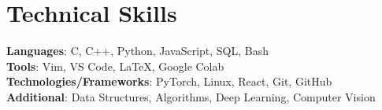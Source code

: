 \documentclass[letterpaper,11pt]{article}
\makeatletter
\newcommand{\resumeItem}[1]{
  \item\small{
    {#1 \vspace{-2pt}}
  }
}
\newcommand{\resumeSubheading}[4]{
  \vspace{-2pt}\item
    \begin{tabular*}{1.0\textwidth}[t]{l@{\extracolsep{\fill}}r}
      \textbf{#1} & \textbf{\small #2} \\
      \textit{\small#3} & \textit{\small #4} \\
    \end{tabular*}\vspace{-7pt}
}
\newcommand{\resumeSubHeadingListStart}{\begin{itemize}[leftmargin=0.0in, label={}]}
\newcommand{\resumeSubHeadingListEnd}{\end{itemize}}
\newcommand{\resumeItemListStart}{\begin{itemize}}
\newcommand{\resumeItemListEnd}{\end{itemize}\vspace{-5pt}}
\makeatother
\begin{document}
\section{Technical Skills}
 \begin{itemize}[leftmargin=0.15in, label={}]
    \small{\item{
     \textbf{Languages}{: C, C++, Python, JavaScript, SQL, Bash} \\
     \textbf{Tools}{: Vim, VS Code, \LaTeX, Google Colab} \\
     \textbf{Technologies/Frameworks}{: PyTorch, Linux, React, Git, GitHub} \\
     \textbf{Additional}{: Data Structures, Algorithms, Deep Learning, Computer Vision} \\
    }}
 \end{itemize}
 \vspace{-16pt}





        


    

        
\end{document}
